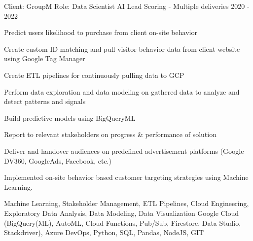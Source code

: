 


\begin{cventries}


\cventry
{Client: GroupM \newline Role: Data Scientist} %
{AI Lead Scoring - Multiple deliveries} %
{}%
{2020 - 2022} %
{ %
\begin{cvitems}
\item {Predict users likelihood to purchase from client on-site behavior}
\item {Create custom ID matching and pull visitor behavior data from client website using Google Tag Manager }
\item {Create ETL pipelines for continuously pulling data to GCP}
\item {Perform data exploration and data modeling on gathered data to analyze and detect patterns and signals}
\item {Build predictive models using BigQueryML}
\item {Report to relevant stakeholders on progress \& performance of solution}
\item {Deliver and handover audiences on predefined advertisement platforms (Google DV360, GoogleAds, Facebook, etc.) }
\item {Implemented on-site behavior based customer targeting strategies using Machine Learning.}
\end{cvitems}
\cventrykeywords
{Machine Learning, Stakeholder Management, ETL Pipelines, Cloud Engineering,  Exploratory Data Analysis, Data Modeling, Data Visualization}
{Google Cloud (BigQuery(ML), AutoML, Cloud Functions, Pub/Sub, Firestore, Data Studio, Stackdriver), Azure DevOps, Python, SQL, Pandas, NodeJS, GIT}
}


\end{cventries}
